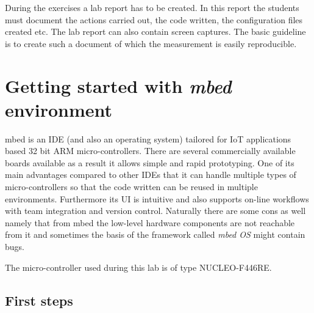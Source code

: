 \documentclass[a4paper]{article}
\begin{document}
During the exercises a lab report has to be created. In this report the students must document the actions carried out,
the code written, the configuration files created etc. The lab report can also contain screen captures. The basic
guideline is to create such a document of which the measurement is easily reproducible.

\section{Getting started with \emph{\textbf{mbed}} environment}

mbed is an IDE (and also an operating system) tailored for IoT applications based 32 bit ARM micro-controllers. There
are several commercially available boards available as a result it allows simple and rapid prototyping. One of its main
advantages compared to other IDEs that it can handle multiple types of micro-controllers so that the code written can
be reused in multiple environments. Furthermore its UI is intuitive and also supports on-line workflows with team
integration and version control. Naturally there are some cons as well namely that from mbed the low-level hardware
components are not reachable from it and sometimes the basis of the framework called \emph{mbed OS} might contain bugs.

The micro-controller used during this lab is of type NUCLEO-F446RE.

\subsection{First steps}
\end{document}
